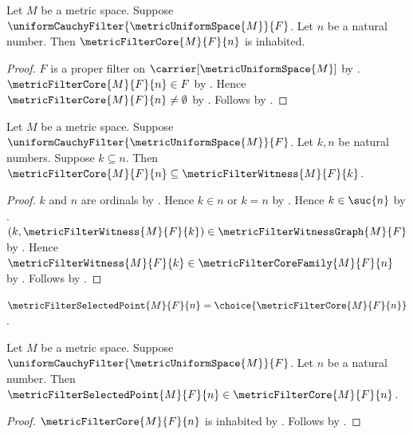 \begin{proposition}\label{metric_filter_core_inhabited}
    Let $M$ be a metric space.
    Suppose $\uniformCauchyFilter{\metricUniformSpace{M}}{F}$.
    Let $n$ be a natural number.
    Then $\metricFilterCore{M}{F}{n}$ is inhabited.
\end{proposition}
\begin{proof}
    $F$ is a proper filter on $\carrier[\metricUniformSpace{M}]$
        by .
    $\metricFilterCore{M}{F}{n}\in F$
        by .
    Hence $\metricFilterCore{M}{F}{n}\neq\emptyset$
        by .
    Follows by .
\end{proof}

\begin{proposition}\label{metric_filter_core_below_witness}
    Let $M$ be a metric space.
    Suppose $\uniformCauchyFilter{\metricUniformSpace{M}}{F}$.
    Let $k,n$ be natural numbers.
    Suppose $k\subseteq n$.
    Then
        $\metricFilterCore{M}{F}{n}
            \subseteq\metricFilterWitness{M}{F}{k}$.
\end{proposition}
\begin{proof}
    $k$ and $n$ are ordinals by .
    Hence $k\in n$ or $k=n$
        by .
    Hence $k\in\suc{n}$ by .
    $(k,\metricFilterWitness{M}{F}{k})
        \in\metricFilterWitnessGraph{M}{F}$
        by .
    Hence
        $\metricFilterWitness{M}{F}{k}
            \in\metricFilterCoreFamily{M}{F}{n}$
        by .
    Follows by
        .
\end{proof}

\begin{definition}\label{metric_filter_selected_point}
    $\metricFilterSelectedPoint{M}{F}{n}=
        \choice{\metricFilterCore{M}{F}{n}}$.
\end{definition}

\begin{proposition}\label{metric_filter_selected_point_in_core}
    Let $M$ be a metric space.
    Suppose $\uniformCauchyFilter{\metricUniformSpace{M}}{F}$.
    Let $n$ be a natural number.
    Then
        $\metricFilterSelectedPoint{M}{F}{n}
            \in\metricFilterCore{M}{F}{n}$.
\end{proposition}
\begin{proof}
    $\metricFilterCore{M}{F}{n}$ is inhabited
        by .
    Follows by
        .
\end{proof}


